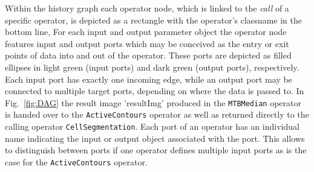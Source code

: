 Within the history graph each operator node, which is linked to the {\em call} of a specific operator,
is depicted as a rectangle with the operator's 
classname in the bottom line,
For each input and output parameter object the operator node features input and output ports which may be conceived as the entry or exit points of data into and out of the operator. These ports are depicted as filled ellipses in light green (input ports) and dark green (output ports),
respectively. Each input port has exactly one incoming edge, while an output
port may be connected to multiple target ports,
depending on where the data is passed to. In Fig.~\ref{fig:DAG} the result
image 'resultImg' produced in the {\tt MTBMedian}
operator is handed over to the {\tt ActiveContours} operator as well as
returned directly to the calling operator
{\tt CellSegmentation}. Each port of an operator has an individual name indicating the input or output object associated
with the port. This allows to distinguish between ports if one operator defines multiple input ports as is
the case for the {\tt ActiveContours} operator.
